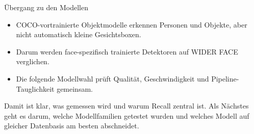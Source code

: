 \begin{frame}{Übergang zu den Modellen}
\begin{itemize}
    \item COCO-vortrainierte Objektmodelle erkennen Personen und Objekte, aber nicht automatisch kleine Gesichtsboxen.
    \item Darum werden face-spezifisch trainierte Detektoren auf WIDER FACE verglichen.
    \item Die folgende Modellwahl prüft Qualität, Geschwindigkeit und Pipeline-Tauglichkeit gemeinsam.
\end{itemize}
\vspace{-0.8em}
\begin{mynote}[Übergabe]
Damit ist klar, was gemessen wird und warum Recall zentral ist. Als Nächstes geht es darum, welche Modellfamilien getestet wurden und welches Modell auf gleicher Datenbasis am besten abschneidet.
\end{mynote}
\end{frame}

